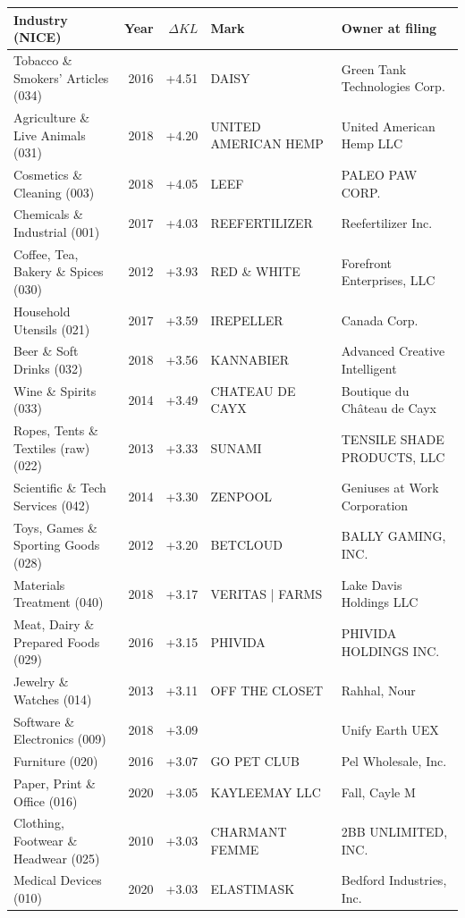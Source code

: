 \begin{tabular}{>{\raggedright\arraybackslash}p{4.0cm}rr>{\raggedright\arraybackslash}p{4.5cm}>{\raggedright\arraybackslash}p{4.5cm}}
\toprule
Industry (NICE) & Year & $\Delta KL$ & Mark & Owner at filing \\
\midrule
Tobacco \& Smokers' Articles (034) & 2016 & +4.51 & DAISY & Green Tank Technologies Corp. \\
Agriculture \& Live Animals (031) & 2018 & +4.20 & UNITED AMERICAN HEMP & United American Hemp LLC \\
Cosmetics \& Cleaning (003) & 2018 & +4.05 & LEEF & PALEO PAW CORP. \\
Chemicals \& Industrial (001) & 2017 & +4.03 & REEFERTILIZER & Reefertilizer Inc. \\
Coffee, Tea, Bakery \& Spices (030) & 2012 & +3.93 & RED \& WHITE & Forefront Enterprises, LLC \\
Household Utensils (021) & 2017 & +3.59 & IREPELLER & 10093939 Canada Corp. \\
Beer \& Soft Drinks (032) & 2018 & +3.56 & KANNABIER & Advanced Creative Intelligent  \\
Wine \& Spirits (033) & 2014 & +3.49 & CHATEAU DE CAYX & Boutique du Château de Cayx \\
Ropes, Tents \& Textiles (raw) (022) & 2013 & +3.33 & SUNAMI & TENSILE SHADE PRODUCTS, LLC \\
Scientific \& Tech Services (042) & 2014 & +3.30 & ZENPOOL & Geniuses at Work Corporation \\
Toys, Games \& Sporting Goods (028) & 2012 & +3.20 & BETCLOUD & BALLY GAMING, INC. \\
Materials Treatment (040) & 2018 & +3.17 & VERITAS | FARMS & 271 Lake Davis Holdings LLC \\
Meat, Dairy \& Prepared Foods (029) & 2016 & +3.15 & PHIVIDA & PHIVIDA HOLDINGS INC. \\
Jewelry \& Watches (014) & 2013 & +3.11 & OFF THE CLOSET & Rahhal, Nour \\
Software \& Electronics (009) & 2018 & +3.09 &  & Unify Earth UEX \\
Furniture (020) & 2016 & +3.07 & GO PET CLUB & Pel Wholesale, Inc. \\
Paper, Print \& Office (016) & 2020 & +3.05 & KAYLEEMAY LLC & Fall, Cayle M \\
Clothing, Footwear \& Headwear (025) & 2010 & +3.03 & CHARMANT FEMME & 2BB UNLIMITED, INC. \\
Medical Devices (010) & 2020 & +3.03 & ELASTIMASK & Bedford Industries, Inc. \\

\end{tabular}
